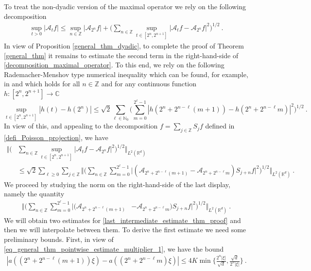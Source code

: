 \documentclass[a4paper, reqno]{amsart}
\theoremstyle{definition}
\newcommand{\Fm}{\mathcal{A}}
\begin{document}
To treat the non-dyadic version of the maximal operator we rely on the following decomposition
\begin{align}\label{decomposition_maximal_operator}
    \sup_{t>0} |\Fm_tf| \leq \sup_{n\in\mathbb{Z}} |\Fm_{2^n}f| + \bigg( \sum_{n\in\mathbb{Z}} \sup_{t\in [2^n,2^{n+1}]}|\Fm_t f- \Fm_{2^n}f|^2\bigg)^{1/2}~.
\end{align}
In view of Proposition \ref{general_thm_dyadic}, to complete the proof of Theorem \ref{general_thm}  it remains to estimate the second term in the right-hand-side of \eqref{decomposition_maximal_operator}.
To this end, we rely on the following Rademacher-Menshov type numerical inequality which can be found, for example, in \cite[Lemma~2.5]{MSZK20} and which holds for all $n\in\mathbb{Z}$ and for any continuous function $h:[2^{n},2^{n+1}]\rightarrow\mathbb{C}$
$$\sup_{t\in [2^n,2^{n+1}]}|h(t)-h(2^n)|\leq \sqrt{2} \sum_{\ell\in\mathbb{N}_0} \bigg( \sum_{m=0}^{2^\ell-1} |h(2^n+2^{n-\ell}(m+1))-h(2^n+2^{n-\ell}m)|^2 \bigg)^{1/2}~.$$
In view of this, and appealing to the decomposition $f=\sum_{j\in\mathbb{Z}}S_j f$ defined in \eqref{defi_Poisson_projection},  we have 
\begin{align*}
    \bigg\Vert \bigg( & \sum_{n\in\mathbb{Z}} \sup_{t\in [2^n,2^{n+1}]}|\Fm_tf  - \Fm_{2^n}f|^2\bigg)^{1/2} \bigg\Vert_{L^2(\mathbb{R}^d)} \\ 
    & \leq \sqrt{2} \sum_{\ell \geq 0} \sum_{j\in\mathbb{Z}} 
    \bigg\Vert \bigg( \sum_{n\in\mathbb{Z}} \sum_{m=0}^{2^\ell -1}\big|(\Fm_{2^n+2^{n-\ell}(m+1)}  - \Fm_{2^n+2^{n-\ell}m})S_{j+n}f \big|^2\bigg)^{1/2} \bigg\Vert_{L^2(\mathbb{R}^d)}~.
\end{align*}
We proceed by studying the norm on the right-hand-side of the last display, namely the quantity
\begin{align}\label{last_intermediate_estimate_thm_proof}
    \bigg\Vert \bigg( \sum_{n\in\mathbb{Z}} \sum_{m=0}^{2^\ell -1}  \big|(\Fm_{2^n+2^{n-\ell}(m+1)} & -  \Fm_{2^n+2^{n-\ell}m})S_{j+n}f \big|^2\bigg)^{1/2} \bigg\Vert_{L^2(\mathbb{R}^d)} ~.
\end{align}
We will obtain two estimates for \eqref{last_intermediate_estimate_thm_proof} and then we will interpolate between them. To derive the first estimate we need some preliminary bounds. First, in view of \eqref{eq_general_thm_pointwise_estimate_multiplier_1}, we have the bound
\begin{align*}
    |a((2^n + 2^{n-\ell}(m+1))\xi)-a((2^n+2^{n-\ell}m)\xi)|\leq 4 K\min \bigg\lbrace \frac{2^n|\xi|}{\sqrt{d}}, \frac{\sqrt{d}}{2^n|\xi|} \bigg\rbrace~.
\end{align*}
\end{document}
